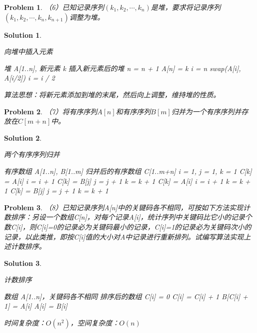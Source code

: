 \documentclass[12pt,a4paper]{amsart}
\newtheorem{problem}{Problem}[section]
\newtheorem{solution}{Solution}[section]
\begin{document}
\begin{problem}
（6）已知记录序列$(k_1, k_2, \cdots, k_n)$是堆，要求将记录序列$(k_1, k_2, \cdots, k_n, k_{n+1})$调整为堆。
\end{problem}

\begin{solution}
\begin{algorithm}
\caption{向堆中插入元素}
\begin{algorithmic}[1]
\REQUIRE 堆 A[1..n], 新元素 k
\ENSURE 插入新元素后的堆
\STATE n = n + 1
\STATE A[n] = k
\STATE i = n
\STATE swap(A[i], A[i/2])
\STATE i = i / 2
\ENDWHILE
\end{algorithmic}
\end{algorithm}

算法思想：将新元素添加到堆的末尾，然后向上调整，维持堆的性质。
\end{solution}

\begin{problem}
（7）将有序序列$A[n]$和有序序列$B[m]$归并为一个有序序列并存放在$C[m+n]$中。
\end{problem}

\begin{solution}
\begin{algorithm}
\caption{两个有序序列归并}
\begin{algorithmic}[1]
\REQUIRE 有序数组 A[1..n], B[1..m]
\ENSURE 归并后的有序数组 C[1..m+n]
\STATE i = 1, j = 1, k = 1
\STATE C[k] = A[i]
\STATE i = i + 1
\ELSE
\STATE C[k] = B[j]
\STATE j = j + 1
\ENDIF
\STATE k = k + 1
\ENDWHILE
{}
\STATE C[k] = A[i]
\STATE i = i + 1
\STATE k = k + 1
\ENDWHILE
{}
\STATE C[k] = B[j]
\STATE j = j + 1
\STATE k = k + 1
\ENDWHILE
\end{algorithmic}
\end{algorithm}
\end{solution}

\begin{problem}
（8）已知记录序列A[n]中的关键码各不相同，可按如下方法实现计数排序：另设一个数组C[n]，对每个记录A[i]，统计序列中关键码比它小的记录个数C[i]，则C[i]=0的记录必为关键码最小的记录，C[i]=1的记录必为关键码次小的记录，以此类推，即按C[i]值的大小对A中记录进行重新排列。试编写算法实现上述计数排序。
\end{problem}

\begin{solution}
\begin{algorithm}
\caption{计数排序}
\begin{algorithmic}[1]
\REQUIRE 数组 A[1..n]，关键码各不相同
\ENSURE 排序后的数组
\STATE C[i] = 0
\ENDFOR
{}
\STATE C[i] = C[i] + 1
\ENDIF
\ENDFOR
\ENDFOR
{}
\STATE B[C[i] + 1] = A[i]
\ENDFOR
{}
\STATE A[i] = B[i]
\ENDFOR
\end{algorithmic}
\end{algorithm}

时间复杂度：$O(n^2)$，空间复杂度：$O(n)$
\end{solution}
\end{document}
